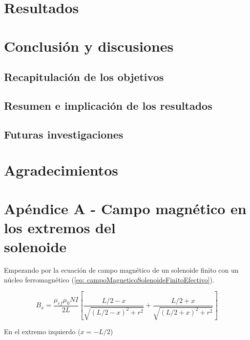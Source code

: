 \documentclass[a4paper,12pt]{article}
\begin{document}
    

\section*{Resultados}

    

\section*{Conclusión y discusiones}

    \subsection*{Recapitulación de los objetivos}



    \subsection*{Resumen e implicación de los resultados}



    \subsection*{Futuras investigaciones}

        

\section*{Agradecimientos}

    

\section*{Apéndice A - Campo magnético en los extremos del \\solenoide}

Empezando por la ecuación de campo magnético de un solenoide finito con un núcleo ferromagnético (\ref{eq: campoMagneticoSolenoideFinitoEfectivo}).

    \begin{equation*}
        B_x = \frac{\mu_{ef}\mu_0 N I}{2L} \left[ \frac{L/2 - x}{\sqrt{(L/2 - x)^2 + r^2}} + \frac{L/2 + x}{\sqrt{(L/2 + x)^2 + r^2}} \right]
    \end{equation*}

    En el extremo izquierdo ($x=-L/2$)
\end{document}
